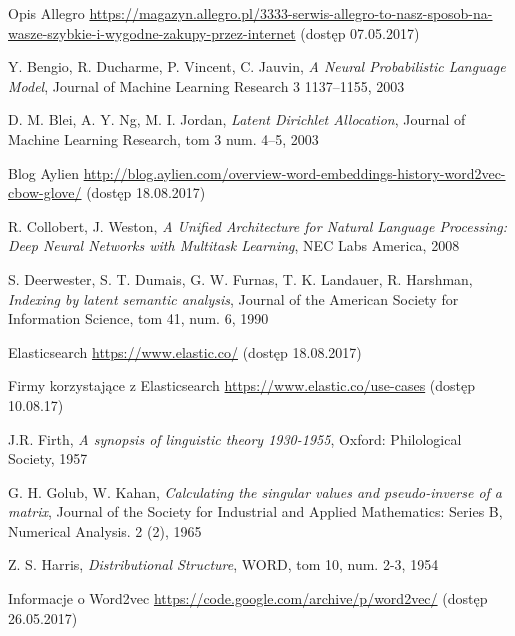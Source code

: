 \documentclass[pl]{minipw} %
\begin{document}
\begin{thebibliography}{30}
		Opis Allegro
		\url{https://magazyn.allegro.pl/3333-serwis-allegro-to-nasz-sposob-na-wasze-szybkie-i-wygodne-zakupy-przez-internet}
		(dostęp 07.05.2017)
	
		Y. Bengio, R. Ducharme, P. Vincent, C. Jauvin,
		\emph{A Neural Probabilistic Language Model},
		Journal of Machine Learning Research 3 1137–1155,
		2003
	
		D. M. Blei, A. Y. Ng, M. I. Jordan,
		\emph{Latent Dirichlet Allocation},
		Journal of Machine Learning Research, tom 3 num. 4–5,
		2003
		
		Blog Aylien
		\url{http://blog.aylien.com/overview-word-embeddings-history-word2vec-cbow-glove/}
		(dostęp 18.08.2017)
	
		R. Collobert, J. Weston,
		\emph{A Unified Architecture for Natural Language Processing: Deep Neural Networks with Multitask Learning},
		NEC Labs America,
		2008
	
		S. Deerwester, S. T. Dumais, G. W. Furnas, T. K. Landauer, R. Harshman,
		\emph{Indexing by latent semantic analysis},
		Journal of the American Society for Information Science, tom 41, num. 6,
		1990
	
		Elasticsearch
		\url{https://www.elastic.co/}
		(dostęp 18.08.2017)
	
		Firmy korzystające z Elasticsearch
		\url{https://www.elastic.co/use-cases}
		(dostęp 10.08.17)
	
		J.R. Firth,
		\emph{A synopsis of linguistic theory 1930-1955},
		Oxford: Philological Society,
		1957
	
		G. H. Golub, W. Kahan,
		\emph{Calculating the singular values and pseudo-inverse of a matrix},
		Journal of the Society for Industrial and Applied Mathematics: Series B, Numerical Analysis. 2 (2),
		1965
	
		Z. S. Harris,
		\emph{Distributional Structure},
		WORD, tom 10, num. 2-3,
		1954
	
		Informacje o Word2vec
		\url{https://code.google.com/archive/p/word2vec/}
		(dostęp 26.05.2017)
	

\end{thebibliography}
\end{document}
